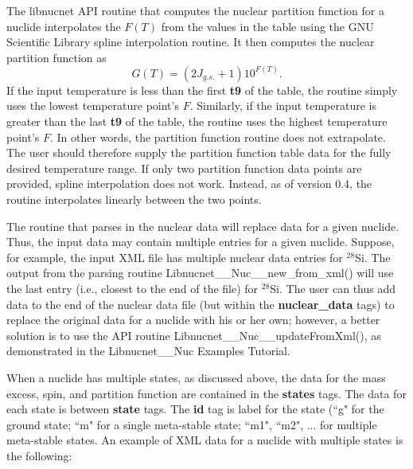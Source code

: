 \documentclass{article}    %
\begin{document}
The libnucnet API routine that computes the nuclear partition
function for a nuclide interpolates the $F(T)$ from the values in
the table using the GNU Scientific Library spline interpolation
routine.  It then computes the nuclear partition function as
\[
G(T) = \left( 2 J_{g.s.} + 1 \right ) 10^{F(T)}.
\]
If the input temperature is less than the first {\bf t9} of the
table, the routine simply uses the lowest temperature point's $F$.
Similarly, if the input temperature is greater than the last {\bf
t9} of the table, the routine uses the highest temperature point's
$F$.  In other words, the partition function routine does not
extrapolate.  The user should therefore supply the partition
function table data for the fully desired temperature range.
If only two partition function data points are provided, spline interpolation
does not work.  Instead, as of version 0.4, the routine interpolates
linearly between the two points.

The routine that parses in the nuclear data will replace data for
a given nuclide.  Thus, the input data may contain multiple entries
for a given nuclide.  Suppose, for example, the input XML file has
multiple nuclear data entries for $^{28}$Si.  The output from the parsing
routine Libnucnet\_\_Nuc\_\_new\_from\_xml() will use the last entry
(i.e., closest to the end of the file) for $^{28}$Si.  The user can thus
add data to the end of the nuclear data file (but within the
{\bf nuclear\_data} tags) to replace the original data for a nuclide
with his or her own; however, a better solution is to use the API routine
Libnucnet\_\_Nuc\_\_updateFromXml(), as demonstrated in the Libnucnet\_\_Nuc
Examples Tutorial.

When a nuclide has multiple states, as discussed above, the data for
the mass excess, spin, and partition function are contained in the
{\bf states} tags.  The data for each state is between {\bf state}
tags.  The {\bf id} tag is label for the state (``g" for the ground
state; ``m" for a single meta-stable state; ``m1", ``m2", ... for
multiple meta-stable states.  An example of XML data for a nuclide
with multiple states is the following:
\end{document}
